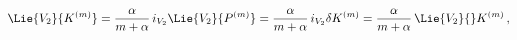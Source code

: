 \begin{equation*}
\Lie{V_{2}}{K^{(m)}} = \frac{\alpha}{m +
\alpha}\,i_{V_{2}}\Lie{V_{2}}{P^{(m)}} = \frac{\alpha}{m + \alpha}\,
i_{V_{2}}\delta K^{(m)} = \frac{\alpha}{m + \alpha}\, \Lie{V_{2}}{}
K^{(m)}\,,
\end{equation*}

